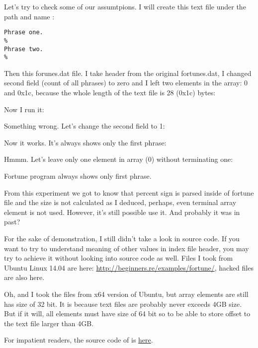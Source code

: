 
Let's try to check some of our assumtpions.
I will create this text file under the path and name :

\begin{lstlisting}
Phrase one.
%
Phrase two.
%
\end{lstlisting}

Then this forunes.dat file. I take header from the original fortunes.dat, I changed second field (count of all phrases) to zero and I left two
elements in the array: 0 and 0x1c, because the whole length of the text  file is 28 (0x1c) bytes:



Now I run it:



Something wrong. Let's change the second field to 1:



Now it works. It's always shows only the first phrase:



Hmmm. Let's leave only one element in array (0) without terminating one:



Fortune program always shows only first phrase.

From this experiment we got to know that percent sign is parsed inside of fortune file and the size is not calculated as I deduced,
perhaps, even terminal array element is not used.
However, it's still possible use it. And probably it was in past?



For the sake of demonstration, I still didn't take a look in  source code.
If you want to try to understand meaning of other values in index file header, you may try to achieve it without looking into source code as well.
Files I took from Ubuntu Linux 14.04 are here: \url{http://beginners.re/examples/fortune/}, hacked files are also here.

Oh, and I took the files from x64 version of Ubuntu, but array elements are still has size of 32 bit.
It is because  text files are probably never exceeds 4GB size.
But if it will, all elements must have size of 64 bit so to be able to store offset to the text file larger than 4GB.

For impatient readers, the source code of  is \href{https://launchpad.net/ubuntu/+source/fortune-mod/1:1.99.1-3.1ubuntu4}{here}.


